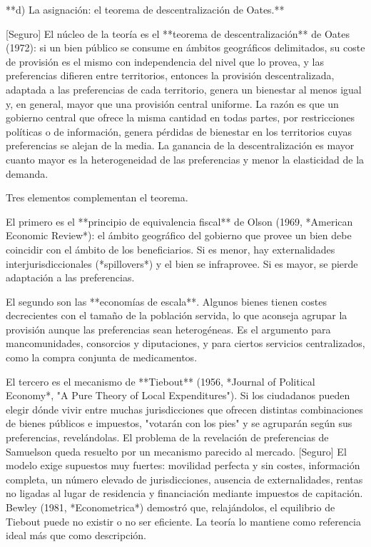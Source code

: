 \documentclass[10pt,a4paper]{article}
\begin{document}
**d) La asignación: el teorema de descentralización de Oates.**

[Seguro] El núcleo de la teoría es el **teorema de descentralización** de Oates (1972): si un bien público se consume en ámbitos geográficos delimitados, su coste de provisión es el mismo con independencia del nivel que lo provea, y las preferencias difieren entre territorios, entonces la provisión descentralizada, adaptada a las preferencias de cada territorio, genera un bienestar al menos igual y, en general, mayor que una provisión central uniforme. La razón es que un gobierno central que ofrece la misma cantidad en todas partes, por restricciones políticas o de información, genera pérdidas de bienestar en los territorios cuyas preferencias se alejan de la media. La ganancia de la descentralización es mayor cuanto mayor es la heterogeneidad de las preferencias y menor la elasticidad de la demanda.

Tres elementos complementan el teorema.

El primero es el **principio de equivalencia fiscal** de Olson (1969, *American Economic Review*): el ámbito geográfico del gobierno que provee un bien debe coincidir con el ámbito de los beneficiarios. Si es menor, hay externalidades interjurisdiccionales (*spillovers*) y el bien se infraprovee. Si es mayor, se pierde adaptación a las preferencias.

El segundo son las **economías de escala**. Algunos bienes tienen costes decrecientes con el tamaño de la población servida, lo que aconseja agrupar la provisión aunque las preferencias sean heterogéneas. Es el argumento para mancomunidades, consorcios y diputaciones, y para ciertos servicios centralizados, como la compra conjunta de medicamentos.

El tercero es el mecanismo de **Tiebout** (1956, *Journal of Political Economy*, "A Pure Theory of Local Expenditures"). Si los ciudadanos pueden elegir dónde vivir entre muchas jurisdicciones que ofrecen distintas combinaciones de bienes públicos e impuestos, "votarán con los pies" y se agruparán según sus preferencias, revelándolas. El problema de la revelación de preferencias de Samuelson queda resuelto por un mecanismo parecido al mercado. [Seguro] El modelo exige supuestos muy fuertes: movilidad perfecta y sin costes, información completa, un número elevado de jurisdicciones, ausencia de externalidades, rentas no ligadas al lugar de residencia y financiación mediante impuestos de capitación. Bewley (1981, *Econometrica*) demostró que, relajándolos, el equilibrio de Tiebout puede no existir o no ser eficiente. La teoría lo mantiene como referencia ideal más que como descripción.
\end{document}
